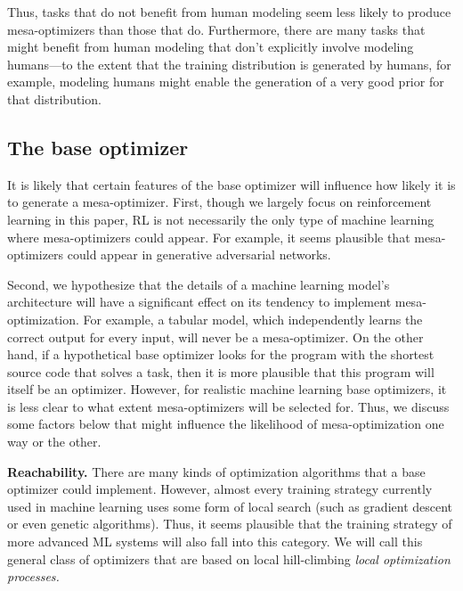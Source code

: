 \documentclass[
  onecolumn,
  natbib,
]{miri-tech-article}
\begin{document}
Thus, tasks that do not benefit from human modeling seem less likely to produce mesa-optimizers than those that do. Furthermore, there are many tasks that might benefit from human modeling that don't explicitly involve modeling humans---to the extent that the training distribution is generated by humans, for example, modeling humans might enable the generation of a very good prior for that distribution.

\subsection{The base optimizer}
\label{sec:2.2}

It is likely that certain features of the base optimizer will influence how likely it is to generate a mesa-optimizer. First, though we largely focus on reinforcement learning in this paper, RL is not necessarily the only type of machine learning where mesa-optimizers could appear. For example, it seems plausible that mesa-optimizers could appear in generative adversarial networks.

Second, we hypothesize that the details of a machine learning model's architecture will have a significant effect on its tendency to implement mesa-optimization. For example, a tabular model, which independently learns the correct output for every input, will never be a mesa-optimizer. On the other hand, if a hypothetical base optimizer looks for the program with the shortest source code that solves a task, then it is more plausible that this program will itself be an optimizer.\cite{paul_solomonoff} However, for realistic machine learning base optimizers, it is less clear to what extent mesa-optimizers will be selected for. Thus, we discuss some factors below that might influence the likelihood of mesa-optimization one way or the other.

\textbf{Reachability.} There are many kinds of optimization algorithms that a base optimizer could implement. However, almost every training strategy currently used in machine learning uses some form of local search (such as gradient descent or even genetic algorithms). Thus, it seems plausible that the training strategy of more advanced ML systems will also fall into this category. We will call this general class of optimizers that are based on local hill-climbing \textit{local optimization processes.}
\end{document}
